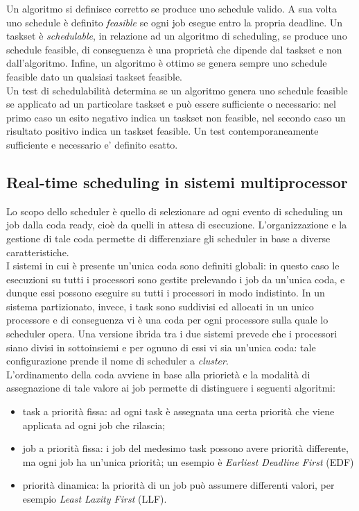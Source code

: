 Un algoritmo si definisce corretto se produce uno schedule valido. A sua volta uno schedule è definito \textit{feasible} se ogni job esegue entro la propria deadline. Un taskset è \textit{schedulable}, in relazione ad un algoritmo di scheduling, se produce uno schedule feasible, di conseguenza è una proprietà che dipende dal taskset e non dall'algoritmo. Infine, un algoritmo è ottimo se genera sempre uno schedule feasible dato un qualsiasi taskset feasible.\\

Un test di schedulabilità determina se un algoritmo genera uno schedule feasible se applicato ad un particolare taskset e può essere sufficiente o necessario: nel primo caso un esito negativo indica un taskset non feasible, nel secondo caso un risultato positivo indica un taskset feasible. Un test contemporaneamente sufficiente e necessario e' definito esatto.\\

\subsection{Real-time scheduling in sistemi multiprocessor}
\label{sec:SchedMulti}

Lo scopo dello scheduler è quello di selezionare ad ogni evento di scheduling un job dalla coda ready, cioè da quelli in attesa di esecuzione. L'organizzazione e la gestione di tale coda permette di differenziare gli scheduler in base a diverse caratteristiche.\\

I sistemi in cui è presente un'unica coda sono definiti globali: in questo caso le esecuzioni su tutti i processori sono gestite prelevando i job da un'unica coda, e dunque essi possono eseguire su tutti i processori in modo indistinto. In un sistema partizionato, invece, i task sono suddivisi ed allocati in un unico processore e di conseguenza vi è una coda per ogni processore sulla quale lo scheduler opera. Una versione ibrida tra i due sistemi prevede che i processori siano divisi in sottoinsiemi e per ognuno di essi vi sia un'unica coda: tale configurazione prende il nome di scheduler a \textit{cluster}.\\

L'ordinamento della coda avviene in base alla priorietà e la modalità di assegnazione di tale valore ai job permette di distinguere i seguenti algoritmi:

\begin{itemize}
	\item task a priorità fissa: ad ogni task è assegnata una certa priorità che viene applicata ad ogni job che rilascia;
	\item job a priorità fissa: i job del medesimo task possono avere priorità differente, ma ogni job ha un'unica priorità; un esempio è \textit{Earliest Deadline First} (EDF)
	\item priorità dinamica: la priorità di un job può assumere differenti valori, per esempio \textit{Least Laxity First} (LLF).
\end{itemize}

